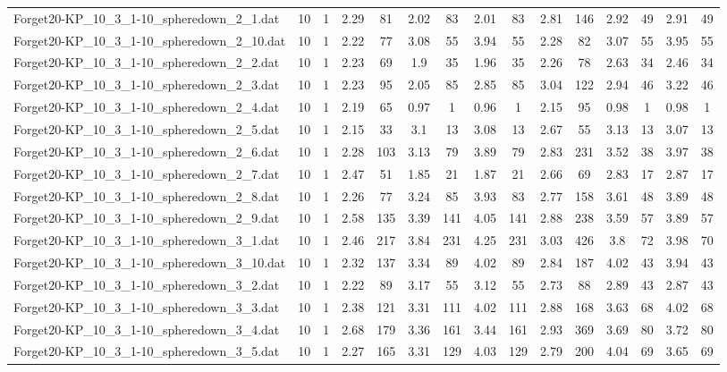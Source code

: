 \begin{table}[!ht]
{\begin{tabular}{lcccccccccccccc}
Forget20-KP\_10\_3\_1-10\_spheredown\_2\_1.dat & 10 & 1 & 2.29 & 81 & 2.02 & 83 & 2.01 & 83 & 2.81 & 146 & 2.92 & 49 & 2.91 & 49 \\
Forget20-KP\_10\_3\_1-10\_spheredown\_2\_10.dat & 10 & 1 & 2.22 & 77 & 3.08 & 55 & 3.94 & 55 & 2.28 & 82 & 3.07 & 55 & 3.95 & 55 \\
Forget20-KP\_10\_3\_1-10\_spheredown\_2\_2.dat & 10 & 1 & 2.23 & 69 & 1.9 & 35 & 1.96 & 35 & 2.26 & 78 & 2.63 & 34 & 2.46 & 34 \\
Forget20-KP\_10\_3\_1-10\_spheredown\_2\_3.dat & 10 & 1 & 2.23 & 95 & 2.05 & 85 & 2.85 & 85 & 3.04 & 122 & 2.94 & 46 & 3.22 & 46 \\
Forget20-KP\_10\_3\_1-10\_spheredown\_2\_4.dat & 10 & 1 & 2.19 & 65 & 0.97 & 1 & 0.96 & 1 & 2.15 & 95 & 0.98 & 1 & 0.98 & 1 \\
Forget20-KP\_10\_3\_1-10\_spheredown\_2\_5.dat & 10 & 1 & 2.15 & 33 & 3.1 & 13 & 3.08 & 13 & 2.67 & 55 & 3.13 & 13 & 3.07 & 13 \\
Forget20-KP\_10\_3\_1-10\_spheredown\_2\_6.dat & 10 & 1 & 2.28 & 103 & 3.13 & 79 & 3.89 & 79 & 2.83 & 231 & 3.52 & 38 & 3.97 & 38 \\
Forget20-KP\_10\_3\_1-10\_spheredown\_2\_7.dat & 10 & 1 & 2.47 & 51 & 1.85 & 21 & 1.87 & 21 & 2.66 & 69 & 2.83 & 17 & 2.87 & 17 \\
Forget20-KP\_10\_3\_1-10\_spheredown\_2\_8.dat & 10 & 1 & 2.26 & 77 & 3.24 & 85 & 3.93 & 83 & 2.77 & 158 & 3.61 & 48 & 3.89 & 48 \\
Forget20-KP\_10\_3\_1-10\_spheredown\_2\_9.dat & 10 & 1 & 2.58 & 135 & 3.39 & 141 & 4.05 & 141 & 2.88 & 238 & 3.59 & 57 & 3.89 & 57 \\
Forget20-KP\_10\_3\_1-10\_spheredown\_3\_1.dat & 10 & 1 & 2.46 & 217 & 3.84 & 231 & 4.25 & 231 & 3.03 & 426 & 3.8 & 72 & 3.98 & 70 \\
Forget20-KP\_10\_3\_1-10\_spheredown\_3\_10.dat & 10 & 1 & 2.32 & 137 & 3.34 & 89 & 4.02 & 89 & 2.84 & 187 & 4.02 & 43 & 3.94 & 43 \\
Forget20-KP\_10\_3\_1-10\_spheredown\_3\_2.dat & 10 & 1 & 2.22 & 89 & 3.17 & 55 & 3.12 & 55 & 2.73 & 88 & 2.89 & 43 & 2.87 & 43 \\
Forget20-KP\_10\_3\_1-10\_spheredown\_3\_3.dat & 10 & 1 & 2.38 & 121 & 3.31 & 111 & 4.02 & 111 & 2.88 & 168 & 3.63 & 68 & 4.02 & 68 \\
Forget20-KP\_10\_3\_1-10\_spheredown\_3\_4.dat & 10 & 1 & 2.68 & 179 & 3.36 & 161 & 3.44 & 161 & 2.93 & 369 & 3.69 & 80 & 3.72 & 80 \\
Forget20-KP\_10\_3\_1-10\_spheredown\_3\_5.dat & 10 & 1 & 2.27 & 165 & 3.31 & 129 & 4.03 & 129 & 2.79 & 200 & 4.04 & 69 & 3.65 & 69 \\

\end{tabular}}
\end{table}
